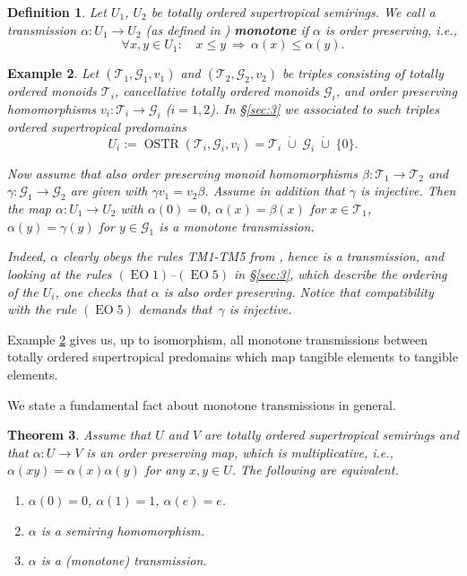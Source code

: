 \documentclass [12pt,a4paper,reqno]{amsart}
\newtheorem{thm}{Theorem} [section]
\newtheorem{example}[thm]{Example}
\newtheorem{defn}[thm]{Definition}
\begin{document}
\begin{defn}\label{defn5.1} Let $U_1$, $U_2$ be totally ordered
supertropical semirings. We call a transmission ${\alpha}: U_1 \to U_2$
(as defined in \cite[\S5]{IKR1}) \textbf{monotone} if ${\alpha}$ is
order preserving, i.e.,
$$ \forall x,y \in U_1: \quad x \leq y \ \Rightarrow \ {\alpha}(x) \leq {\alpha}(y).$$

\end{defn}

\begin{example}\label{examps5.2} Let $({\mathcal T}_1, {\mathcal G}_1, v_1)$ and $({\mathcal T}_2, {\mathcal G}_2,
v_2)$ be triples consisting of totally ordered monoids ${\mathcal T}_i$,
cancellative totally ordered monoids ${\mathcal G}_i$, and order preserving
homomorphisms $v_i : {\mathcal T}_i \to {\mathcal G}_i$ ($i =1,2$). In \S\ref{sec:3}
we associated to such triples ordered supertropical predomains
$$ U_i:= {\operatorname{OSTR}}({\mathcal T}_i, {\mathcal G}_i, v_i) ={\mathcal T}_i { \; \dot \cup \;} {\mathcal G}_i { \; \dot \cup \;} \{ 0 \}. $$

Now assume that also order preserving monoid homomorphisms ${\beta}:
{\mathcal T}_1 \to {\mathcal T}_2$ and \\ ${\gamma}: {\mathcal G}_1 \to {\mathcal G}_2$ are given with ${\gamma}
v_1 =  v_2 {\beta}$. Assume in addition that ${\gamma}$ is injective. Then
the map ${\alpha}:U_1 \to U_2$ with ${\alpha}(0)= 0$,  ${\alpha}(x)= {\beta}(x)$ for
$x \in {\mathcal T}_1$, ${\alpha}(y)= {\gamma}(y)$ for $y \in {\mathcal G}_1$ is a monotone
transmission.

Indeed, ${\alpha}$ clearly obeys the rules TM1-TM5 from
\cite[\S5]{IKR1}, hence is a transmission, and looking at the
rules $({\operatorname{EO}}1)$--$({\operatorname{EO}}5)$ in \S\ref{sec:3}, which describe the
ordering of the $U_i$, one checks that ${\alpha}$ is also order
preserving. Notice that compatibility with the rule $({\operatorname{EO}}5)$
demands that~${\gamma}$ is injective.
\end{example}

Example \ref{examps5.2} gives us, up to isomorphism, all monotone
transmissions between totally ordered supertropical predomains
which map tangible elements to tangible elements.

We state  a fundamental fact about monotone transmissions in
general.

\begin{thm}\label{thm5.3}
Assume that $U$ and $V$ are totally ordered supertropical
semirings and that ${\alpha} : U \to V$ is an order preserving map,
which is multiplicative, i.e., ${\alpha}(xy) = {\alpha}(x) {\alpha}(y)$ for any
$x,y \in U$. The following are equivalent.

\begin{enumerate}
    \item[(1)] ${\alpha}(0) =0$,  ${\alpha}(1) =1$, ${\alpha}(e) =e$.
    \item[(2)] ${\alpha}$ is a semiring homomorphism.

    \item[(3)] ${\alpha}$ is a (monotone) transmission.
\end{enumerate}
\end{thm}
\end{document}
